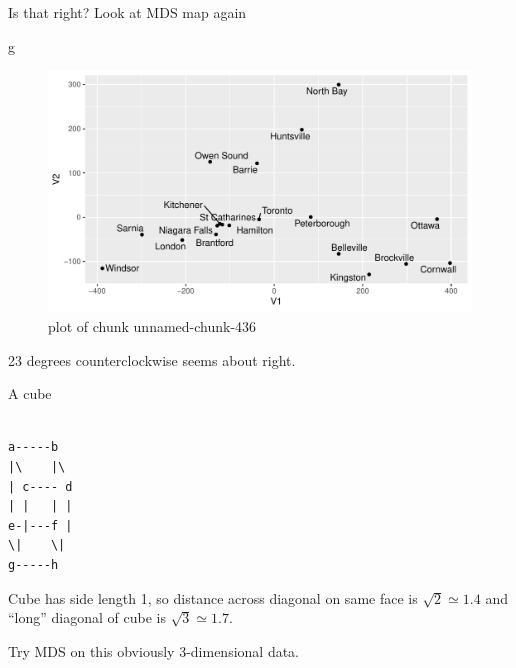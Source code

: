 \documentclass[ignorenonframetext,]{beamer}
\newenvironment{Shaded}{\begin{snugshade}}{\end{snugshade}}
\newcommand{\NormalTok}[1]{#1}
\begin{document}
\begin{frame}[fragile]{Is that right? Look at MDS map again}
\protect\hypertarget{is-that-right-look-at-mds-map-again}{}

\begin{Shaded}
\begin{Highlighting}[]
\NormalTok{g}
\end{Highlighting}
\end{Shaded}

\begin{figure}
\centering
\includegraphics{figure/unnamed-chunk-436-1.pdf}
\caption{plot of chunk unnamed-chunk-436}
\end{figure}

23 degrees counterclockwise seems about right.

\end{frame}

\begin{frame}[fragile]{A cube}
\protect\hypertarget{a-cube}{}

\begin{verbatim}

a-----b
|\    |\
| c---- d
| |   | |
e-|---f |
\|    \|
g-----h
\end{verbatim}

Cube has side length 1, so distance across diagonal on same face is
\(\sqrt{2}\simeq 1.4\) and ``long'' diagonal of cube is
\(\sqrt{3}\simeq 1.7\). \vspace{3ex}

Try MDS on this obviously 3-dimensional data.

\end{frame}
\end{document}
